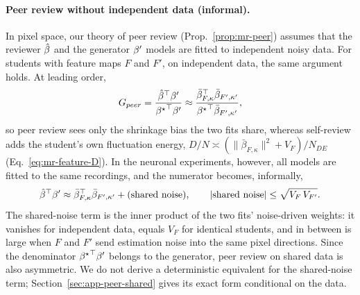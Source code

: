 {\paragraph{Peer review without independent data (informal).}
In pixel space, our theory of peer review (Prop.~\ref{prop:mr-peer}) assumes that the reviewer $\hat{\beta}$ and the generator ${\beta^{\prime}}$ models are fitted to independent noisy data. 
For students with feature maps $F$ and $F'$, on independent data, the same argument holds. At leading order,
\[
G_{peer}=\frac{{\hat{\beta}}^\top{\beta^{\prime}}}{{{\beta^{\star}}}^\top{\beta^{\prime}}}
\approx\frac{\bar\beta_{F,\kappa}^\top\bar\beta_{F',\kappa'}}{{{\beta^{\star}}}^\top\bar\beta_{F',\kappa'}},
\]
so peer review sees only the shrinkage bias the two fits share, whereas self-review adds the student's own fluctuation energy,
$D/N\asymp(\|\bar\beta_{F,\kappa}\|^2+V_F)/N_{DE}$
(Eq.~\ref{eq:mr-feature-D}).  
In the neuronal experiments, however, all models are fitted to the same recordings, and the numerator becomes, informally,
\[
{\hat{\beta}}^\top{\beta^{\prime}}\approx\bar\beta_{F,\kappa}^\top\bar\beta_{F',\kappa'}
+(\text{shared noise}),\qquad
|\text{shared noise}|\le\sqrt{V_F\,V_{F'}} .
\]
The shared-noise term is the inner product of the two fits' noise-driven weights: it vanishes for independent data, equals $V_F$ for identical students, and in between is large when $F$ and $F'$ send estimation noise
into the same pixel directions.  Since the denominator ${{\beta^{\star}}}^\top{\beta^{\prime}}$
belongs to the generator, peer review on shared data is also asymmetric.  We
do not derive a deterministic equivalent for the shared-noise term;
Section~\ref{sec:app-peer-shared} gives its exact form conditional on the
data.}
